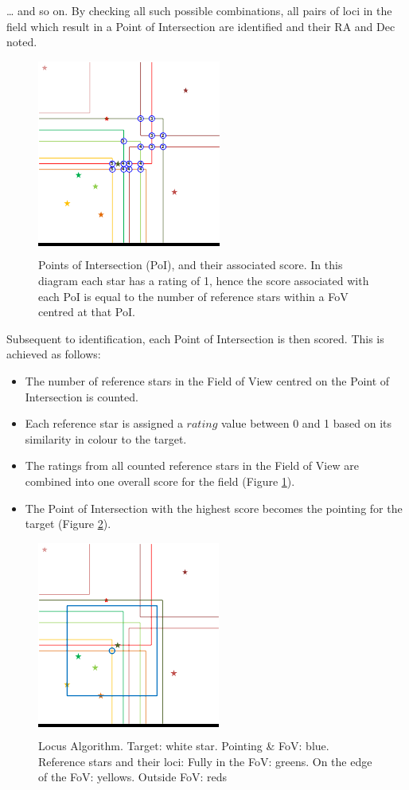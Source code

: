 \documentclass[]{elsarticle} %
\makeatletter
\providecommand{\tightlist}{%
  \setlength{\itemsep}{0pt}\setlength{\parskip}{0pt}}
\def\maxwidth{\ifdim\Gin@nat@width>\linewidth\linewidth
\else\Gin@nat@width\fi}
\let\Oldincludegraphics\includegraphics
\renewcommand{\includegraphics}[1]{\Oldincludegraphics[width=\maxwidth]{#1}}
\makeatother
\begin{document}
\ldots{} and so on. By checking all such possible combinations, all
pairs of loci in the field which result in a Point of Intersection are
identified and their RA and Dec noted.

\begin{figure}[!htb]
\centering
\colorbox{black}{\includegraphics{fig4.png}}
\caption{\label{PoIscores}Points of Intersection (PoI), and their associated
score. In this diagram each star has a rating of 1, hence the score
associated with each PoI is equal to the number of reference stars
within a FoV centred at that PoI.}
\end{figure}
Subsequent to identification, each Point of Intersection is then scored.
This is achieved as follows:

\begin{itemize}
\tightlist
\item
  The number of reference stars in the Field of View centred on the
  Point of Intersection is counted.
\item
  Each reference star is assigned a \(rating\) value between 0 and 1 based
  on its similarity in colour to the target.
\item
  The ratings from all counted reference stars in the Field of View are
  combined into one overall score for the field (Figure \ref{PoIscores}).
\item
  The Point of Intersection with the highest score becomes the pointing
  for the target (Figure \ref{final}).
\end{itemize}


\begin{figure}[!htb]
\centering
\colorbox{black}{\includegraphics{fig5.png}}
\caption{\label{final}Locus Algorithm. Target: white star. Pointing \& FoV:
blue. Reference stars and their loci: Fully in the FoV: greens. On the
edge of the FoV: yellows. Outside FoV: reds}
\end{figure}
\end{document}
